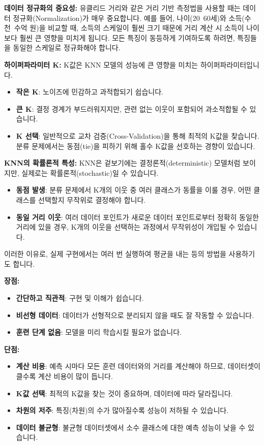 \documentclass[11pt,a4paper]{article}
\theoremstyle{definition}
\begin{document}
\textbf{데이터 정규화의 중요성:}
유클리드 거리와 같은 거리 기반 측정법을 사용할 때는 데이터 정규화(Normalization)가 매우 중요합니다. 예를 들어, 나이(20~60세)와 소득(수천~수억 원)을 비교할 때, 소득의 스케일이 훨씬 크기 때문에 거리 계산 시 소득이 나이보다 훨씬 큰 영향을 미치게 됩니다. 모든 특징이 동등하게 기여하도록 하려면, 특징들을 동일한 스케일로 정규화해야 합니다.

\textbf{하이퍼파라미터 K:}
K값은 KNN 모델의 성능에 큰 영향을 미치는 하이퍼파라미터입니다.
\begin{itemize}
    \item \textbf{작은 K}: 노이즈에 민감하고 과적합되기 쉽습니다.
    \item \textbf{큰 K}: 결정 경계가 부드러워지지만, 관련 없는 이웃이 포함되어 과소적합될 수 있습니다.
    \item \textbf{K 선택}: 일반적으로 교차 검증(Cross-Validation)을 통해 최적의 K값을 찾습니다. 분류 문제에서는 동점(tie)을 피하기 위해 홀수 K값을 선호하는 경향이 있습니다.
\end{itemize}

\textbf{KNN의 확률론적 특성:}
KNN은 겉보기에는 결정론적(deterministic) 모델처럼 보이지만, 실제로는 확률론적(stochastic)일 수 있습니다.
\begin{itemize}
    \item \textbf{동점 발생}: 분류 문제에서 K개의 이웃 중 여러 클래스가 동률을 이룰 경우, 어떤 클래스를 선택할지 무작위로 결정해야 합니다.
    \item \textbf{동일 거리 이웃}: 여러 데이터 포인트가 새로운 데이터 포인트로부터 정확히 동일한 거리에 있을 경우, K개의 이웃을 선택하는 과정에서 무작위성이 개입될 수 있습니다.
\end{itemize}
이러한 이유로, 실제 구현에서는 여러 번 실행하여 평균을 내는 등의 방법을 사용하기도 합니다.

\textbf{장점:}
\begin{itemize}
    \item \textbf{간단하고 직관적}: 구현 및 이해가 쉽습니다.
    \item \textbf{비선형 데이터}: 데이터가 선형적으로 분리되지 않을 때도 잘 작동할 수 있습니다.
    \item \textbf{훈련 단계 없음}: 모델을 미리 학습시킬 필요가 없습니다.
\end{itemize}

\textbf{단점:}
\begin{itemize}
    \item \textbf{계산 비용}: 예측 시마다 모든 훈련 데이터와의 거리를 계산해야 하므로, 데이터셋이 클수록 계산 비용이 많이 듭니다.
    \item \textbf{K값 선택}: 최적의 K값을 찾는 것이 중요하며, 데이터에 따라 달라집니다.
    \item \textbf{차원의 저주}: 특징(차원)의 수가 많아질수록 성능이 저하될 수 있습니다.
\item \textbf{데이터 불균형}: 불균형 데이터셋에서 소수 클래스에 대한 예측 성능이 낮을 수 있습니다.
\end{itemize}
\end{document}
